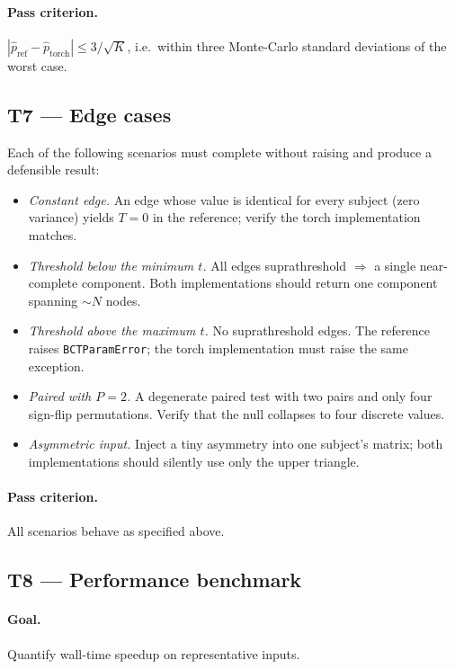 \documentclass[11pt]{article}
\begin{document}
\paragraph{Pass criterion.} $|\hat p_{\textrm{ref}} - \hat p_{\textrm{torch}}| \le 3 / \sqrt{K}$, i.e.\ within three Monte-Carlo standard deviations of the worst case.

\subsection{T7 --- Edge cases}

Each of the following scenarios must complete without raising and produce a defensible result:

\begin{itemize}[leftmargin=2.0em]
\item \emph{Constant edge.} An edge whose value is identical for every subject (zero variance) yields $T = 0$ in the reference; verify the torch implementation matches.
\item \emph{Threshold below the minimum $t$.} All edges suprathreshold $\Rightarrow$ a single near-complete component. Both implementations should return one component spanning $\sim N$ nodes.
\item \emph{Threshold above the maximum $t$.} No suprathreshold edges. The reference raises \texttt{BCTParamError}; the torch implementation must raise the same exception.
\item \emph{Paired with $P=2$.} A degenerate paired test with two pairs and only four sign-flip permutations. Verify that the null collapses to four discrete values.
\item \emph{Asymmetric input.} Inject a tiny asymmetry into one subject's matrix; both implementations should silently use only the upper triangle.
\end{itemize}

\paragraph{Pass criterion.} All scenarios behave as specified above.

\subsection{T8 --- Performance benchmark}

\paragraph{Goal.} Quantify wall-time speedup on representative inputs.
\end{document}
